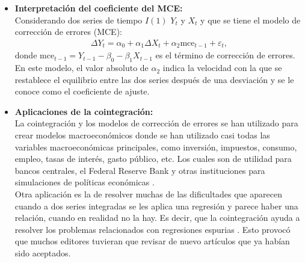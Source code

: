 \documentclass[12pt]{article}
\begin{document}
\begin{itemize}
    \item \textbf{Interpretación del coeficiente del MCE:}\\
    Considerando dos series de tiempo $I(1)$ $Y_t$ y $X_t$ y que se tiene el modelo de corrección de errores (MCE):
    \begin{align}
        \Delta Y_t = \alpha_0 + \alpha_1 \Delta X_t + \alpha_2 \text{mce}_{t-1} + \varepsilon_t,
        \label{eq:mce}
    \end{align}
    donde $\text{mce}_{t-1} = Y_{t-1} - \beta_0 - \beta_1 X_{t-1}$ es el término de corrección de errores. En este 
    modelo, el valor absoluto de $\alpha_2$ indica la velocidad con la que se restablece el equilibrio entre las dos series 
    después de una desviación \cite{gujarati_econometri_2015} y se le conoce como el coeficiente de ajuste.
    
    \item \textbf{Aplicaciones de la cointegración:}\\
    La cointegración y los modelos de corrección de errores se han utilizado para crear modelos macroeconómicos
    donde se han utilizado casi todas las variables macroeconómicas principales, como inversión, impuestos,
    consumo, empleo, tasas de interés, gasto público, etc. Los cuales son de utilidad para bancos centrales, el 
    Federal Reserve Bank y otras instituciones para simulaciones de políticas económicas \cite{granger2004}.\\
    Otra aplicación es la de resolver muchas de las dificultades que aparecen cuando a dos series 
    integradas se les aplica una regresión y parece haber una relación, cuando en realidad no la hay.
    Es decir, que la cointegración ayuda a resolver los problemas relacionados con regresiones espurias \cite{granger2004}.
    Esto provocó que muchos editores tuvieran que revisar de nuevo artículos que ya habían sido aceptados.\\
    
\end{itemize}

\end{document}
